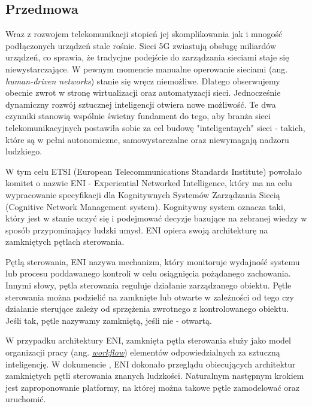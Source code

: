 \subsection{Przedmowa}

Wraz z rozwojem telekomunikacji stopień jej skomplikowania jak i mnogość podłączonych urządzeń stale rośnie. Sieci 5G zwiastują obsługę miliardów urządzeń, co sprawia, że tradycjne podejście do zarządzania sieciami staje się niewystarczające. W pewnym momencie manualne operowanie sieciami (ang. \textit{human-driven networks}) stanie się wręcz niemożliwe. Dlatego obserwujemy obecnie zwrot w stronę wirtualizacji oraz automatyzacji sieci. Jednocześnie dynamiczny rozwój sztucznej inteligencji otwiera nowe możliwość. Te dwa czynniki stanowią wspólnie świetny fundament do tego, aby branża sieci telekomunikacyjnych postawiła sobie za cel budowę "inteligentnych" sieci - takich, które są w pełni autonomiczne, samowystarczalne oraz niewymagają nadzoru ludzkiego.

W tym celu ETSI (European Telecommunications Standards Institute) powołało komitet o nazwie ENI - Experiential Networked Intelligence, który ma na celu wypracowanie specyfikacji dla Kognitywnych Systemów Zarządzania Siecią (Cognitive Network Management system). Kognitywny system oznacza taki, który jest w stanie uczyć się i podejmować decyzje bazujące na zebranej wiedzy w sposób przypominający ludzki umysł. ENI opiera swoją architekturę na zamkniętych pętlach sterowania.

Pętlą sterowania, ENI nazywa mechanizm, który monitoruje wydajność systemu lub procesu poddawanego kontroli w celu osiągnięcia pożądanego zachowania. Innymi słowy, pętla sterowania reguluje działanie zarządzanego obiektu. Pętle sterowania można podzielić na zamknięte lub otwarte w zależności od tego czy działanie sterujące zależy od sprzężenia zwrotnego z kontrolowanego obiektu. Jeśli tak, pętle nazywamy zamkniętą, jeśli nie - otwartą. 

W przypadku architektury ENI, zamknięta pętla sterowania służy jako model organizacji pracy (ang. \hyperlink{def:workflow}{\textit{workflow}}) elementów odpowiedzialnych za sztuczną inteligencję. W dokumencie \cite*{enioverview}, ENI dokonało przeglądu obiecujących architektur zamkniętych pętli sterowania znanych ludzkości. Naturalnym następnym krokiem jest zaproponowanie platformy, na której można takowe pętle zamodelować oraz uruchomić. 


